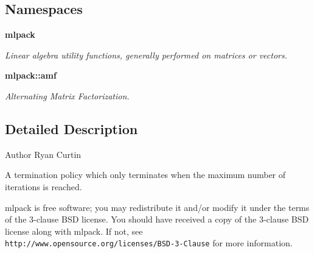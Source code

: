 \subsection*{Namespaces}
\begin{DoxyCompactItemize}
\item 
 \textbf{ mlpack}
\begin{DoxyCompactList}\small\item\em Linear algebra utility functions, generally performed on matrices or vectors. \end{DoxyCompactList}\item 
 \textbf{ mlpack\+::amf}
\begin{DoxyCompactList}\small\item\em Alternating Matrix Factorization. \end{DoxyCompactList}\end{DoxyCompactItemize}


\subsection{Detailed Description}
\begin{DoxyAuthor}{Author}
Ryan Curtin
\end{DoxyAuthor}
A termination policy which only terminates when the maximum number of iterations is reached.

mlpack is free software; you may redistribute it and/or modify it under the terms of the 3-\/clause B\+SD license. You should have received a copy of the 3-\/clause B\+SD license along with mlpack. If not, see {\tt http\+://www.\+opensource.\+org/licenses/\+B\+S\+D-\/3-\/\+Clause} for more information. 
